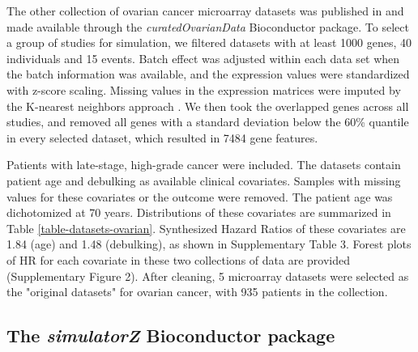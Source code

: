 \documentclass{bioinfo}
\begin{document}
  The other collection of ovarian cancer microarray datasets was published in
  \citet{Ganzfried2013} and made available through the \emph{curatedOvarianData} 
  Bioconductor package. To select a group of studies for simulation, 
  we filtered datasets with at least 1000 genes, 40 individuals and 15 events. Batch effect was
  adjusted within each data set when the batch information was available, 
  and the expression values were standardized with z-score scaling.
  Missing values in the expression matrices 
  were imputed by the K-nearest neighbors approach \citep{KNN}. We then took the overlapped 
  genes across all studies, and removed all genes with a standard deviation below 
  the 60\% quantile in every selected dataset, which resulted in 7484 gene features.
 
  Patients with late-stage, high-grade cancer were included. 
  The datasets contain patient age and debulking as available 
  clinical covariates. Samples with missing values for these covariates or the outcome were removed. The patient age was dichotomized at 70 years. Distributions 
  of these covariates are summarized in Table \ref{table-datasets-ovarian}. Synthesized Hazard Ratios 
  of these covariates are 1.84 (age) and 1.48 (debulking), 
  as shown in Supplementary Table 3. Forest plots of HR for 
  each covariate in these two collections of data
  are provided (Supplementary Figure 2). After cleaning, 5 microarray datasets were selected as the "original datasets" for ovarian cancer, with 935 patients in the collection.
  

  \subsection{The \emph{simulatorZ} Bioconductor package}
 
\end{document}
